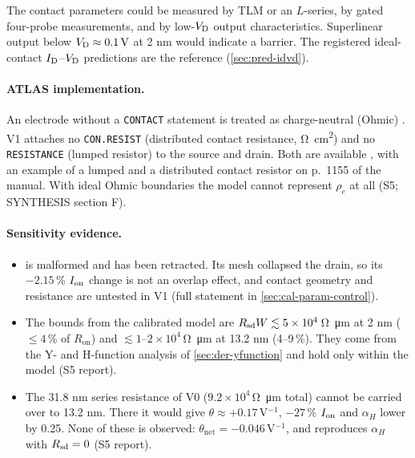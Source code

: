 The contact parameters could be measured by TLM or an $L$-series, by gated four-probe measurements, and by low-$V_{\mathrm{D}}$ output characteristics. Superlinear output below $V_{\mathrm{D}}\approx\SI{0.1}{V}$ at 2 nm would indicate a barrier. The registered ideal-contact $I_{\mathrm{D}}$--$V_{\mathrm{D}}$ predictions are the reference (\cref{sec:pred-idvd}).

\paragraph{ATLAS implementation.}
An electrode without a \texttt{CONTACT} statement is treated as charge-neutral (Ohmic) \citep[p.~1145]{AtlasManual}. V1 attaches no \texttt{CON.RESIST} (distributed contact resistance, \si{\ohm\centi\metre\squared}) and no \texttt{RESISTANCE} (lumped resistor) to the source and drain. Both are available \citep[p.~1153]{AtlasManual}, with an example of a lumped and a distributed contact resistor on p.~1155 of the manual. With ideal Ohmic boundaries the model cannot represent $\rho_c$ at all (S5; SYNTHESIS section F).

\paragraph{Sensitivity evidence.}
\begin{itemize}
\item {} is malformed and has been retracted. Its mesh collapsed the drain, so its $-2.15$\,\% $I_{\mathrm{on}}$ change is not an overlap effect, and contact geometry and resistance are untested in V1 (full statement in \cref{sec:cal-param-control}).
\item The bounds from the calibrated model are $R_{\mathrm{sd}} W\lesssim5\times10^{4}$\,\si{\ohm\micro\metre} at 2 nm ($\le4$\,\% of $R_{\mathrm{on}}$) and $\lesssim1$--$2\times10^{4}$\,\si{\ohm\micro\metre} at 13.2 nm (4--9\,\%). They come from the Y- and H-function analysis of \cref{sec:der-yfunction} and hold only within the model (S5 report).
\item The 31.8 nm series resistance of V0 ($9.2\times10^{4}$\,\si{\ohm\micro\metre} total) cannot be carried over to 13.2 nm. There it would give $\theta\approx+0.17$\,V$^{-1}$, $-27$\,\% $I_{\mathrm{on}}$ and $\alpha_H$ lower by 0.25. None of these is observed: $\theta_{\mathrm{net}}=-0.046$\,V$^{-1}$, and  reproduces $\alpha_H$ with $R_{\mathrm{sd}}=0$ (S5 report).
\end{itemize}

